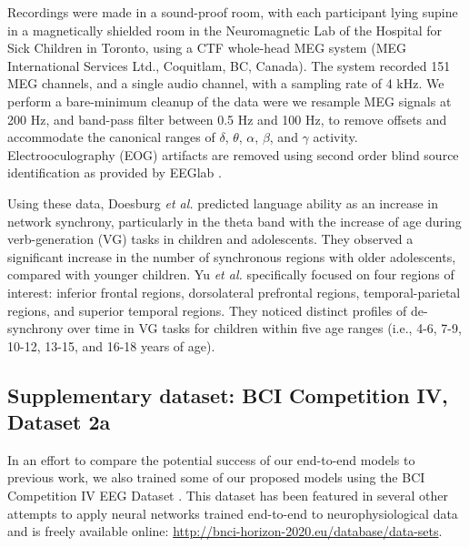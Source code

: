 \documentclass[fleqn,10pt]{wlscirep}
\begin{document}
Recordings were made in a sound-proof room, with each participant lying supine in a magnetically shielded room in the Neuromagnetic Lab of the Hospital for Sick Children in Toronto, using a CTF whole-head MEG system (MEG International Services Ltd., Coquitlam, BC, Canada). The system recorded 151 MEG channels, and a single audio channel, with a sampling rate of 4 kHz. We perform a bare-minimum cleanup of the data were we resample MEG signals at 200 Hz, and band-pass filter between 0.5 Hz and 100 Hz, to remove offsets and accommodate the canonical ranges of $\delta$, $\theta$, $\alpha$, $\beta$, and $\gamma$ activity. Electrooculography (EOG) artifacts are removed using second order blind source identification as provided by EEGlab \cite{Delorme04eeglab}.

Using these data, Doesburg {\em et al.} \cite{Doesburg2016} predicted language ability as an increase in network synchrony, particularly in the theta band with the increase of age during verb-generation (VG) tasks in children and adolescents. They observed a significant increase in the number of synchronous regions with older adolescents, compared with younger children. Yu {\em et al.} \cite{Yu2014} specifically focused on four regions of interest: inferior frontal regions, dorsolateral prefrontal regions, temporal-parietal regions, and superior temporal regions. They noticed distinct profiles of de-synchrony over time in VG tasks for children within five age ranges (i.e., 4-6, 7-9, 10-12, 13-15, and 16-18 years of age).

\subsection*{Supplementary dataset: BCI Competition IV, Dataset 2a}

In an effort to compare the potential success of our end-to-end models to previous work, we also trained some of our proposed models using the BCI Competition IV EEG Dataset \cite{Tangermann2012}. This dataset has been featured in several other attempts to apply neural networks trained end-to-end to neurophysiological data \cite{Schirrmeister2017,Tabar2017,Lawhern2017,Sun} and is freely available online: \url{http://bnci-horizon-2020.eu/database/data-sets}.
\end{document}
